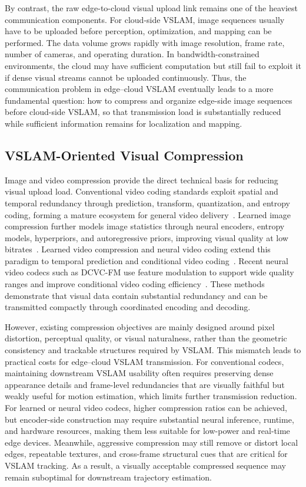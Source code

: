 \documentclass[journal]{IEEEtran}
\begin{document}
By contrast, the raw edge-to-cloud visual upload link remains one of the heaviest communication components. For cloud-side VSLAM, image sequences usually have to be uploaded before perception, optimization, and mapping can be performed. The data volume grows rapidly with image resolution, frame rate, number of cameras, and operating duration. In bandwidth-constrained environments, the cloud may have sufficient computation but still fail to exploit it if dense visual streams cannot be uploaded continuously. Thus, the communication problem in edge--cloud VSLAM eventually leads to a more fundamental question: how to compress and organize edge-side image sequences before cloud-side VSLAM, so that transmission load is substantially reduced while sufficient information remains for localization and mapping.

\subsection{VSLAM-Oriented Visual Compression}

Image and video compression provide the direct technical basis for reducing visual upload load. Conventional video coding standards exploit spatial and temporal redundancy through prediction, transform, quantization, and entropy coding, forming a mature ecosystem for general video delivery~\cite{sullivan2012hevc,sullivan2012h264,bross2021vvc}. Learned image compression further models image statistics through neural encoders, entropy models, hyperpriors, and autoregressive priors, improving visual quality at low bitrates~\cite{balle2018variational,minnen2018joint}. Learned video compression and neural video coding extend this paradigm to temporal prediction and conditional video coding~\cite{agustsson2020scale,li2024dcvcfm}. Recent neural video codecs such as DCVC-FM use feature modulation to support wide quality ranges and improve conditional video coding efficiency~\cite{li2024dcvcfm}. These methods demonstrate that visual data contain substantial redundancy and can be transmitted compactly through coordinated encoding and decoding.

However, existing compression objectives are mainly designed around pixel distortion, perceptual quality, or visual naturalness, rather than the geometric consistency and trackable structures required by VSLAM. This mismatch leads to practical costs for edge--cloud VSLAM transmission. For conventional codecs, maintaining downstream VSLAM usability often requires preserving dense appearance details and frame-level redundancies that are visually faithful but weakly useful for motion estimation, which limits further transmission reduction. For learned or neural video codecs, higher compression ratios can be achieved, but encoder-side construction may require substantial neural inference, runtime, and hardware resources, making them less suitable for low-power and real-time edge devices. Meanwhile, aggressive compression may still remove or distort local edges, repeatable textures, and cross-frame structural cues that are critical for VSLAM tracking. As a result, a visually acceptable compressed sequence may remain suboptimal for downstream trajectory estimation.
\end{document}
